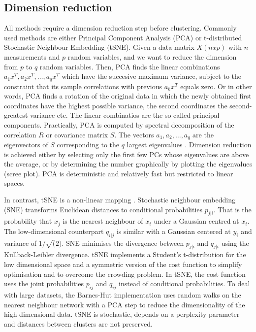 \documentclass[11pt, a4paper]{article}\usepackage[]{graphicx}\usepackage[]{color}
\begin{document}
\subsection{Dimension reduction}
All methods require a dimension reduction step before clustering. Commonly used methods are either Principal Component Analysis (PCA) \citep{hotelling1933analysis} or t-distributed Stochastic Neighbour Embedding (tSNE). Given a data matrix $X (nxp)$ with $n$ measurements and $p$ random variables, and we want to reduce the dimension from $p$ to $q$ random variables. Then, PCA finds the linear combinations $a_{1}x^T, a_{2}x^T,\ldots, a_{q}x^T$ which have the succesive maximum variance, subject to the constraint that its sample correlations with previous $a_{k}x^T$ equals zero.
Or in other words, PCA finds a rotation of the original data in which the newly obtained first coordinates have the highest possible variance, the second coordinates the second-greatest variance etc. The linear combinatios are the so called principal components.
Practically, PCA is computed by spectral decomposition of the correlation $R$ or covariance matrix $S$. The vectors $a_{1}, a_{2},\ldots, a_{q}$ are the eigenvectors of $S$ corresponding to the $q$ largest eigenvalues \citep{jolliffe1986principal}.  Dimension reduction is achieved either by selecting only the first few PCs whose eigenvalues are above the average, or by determining the number graphically by plotting the eigenvalues (scree plot). PCA is deterministic and relatively fast but restricted to linear spaces.

In contrast,  tSNE is a non-linear mapping \citep{van2013barnes}. Stochastic neighbour embedding (SNE) transforms Euclidean distances to conditional probabilities $p_{j|i}$. That is the probability that \(x_j\) is the nearest neighbour of $x_i$ under a Gaussian centred at $x_i$. The low-dimensional counterpart $q_{i|j}$ is similar with a Gaussian centered at $y_i$ and variance of $1/\sqrt(2)$. SNE minimises the divergence between $p_{j|i}$ and $q_{j|i}$ using the Kullback-Leibler divergence. tSNE implements a Student's t-distribution for the low dimensional space and a symmetric version of the cost function to simplify optimisation and to overcome the crowding problem. In tSNE, the cost function uses the joint probabilities $p_{ij}$ and $q_{ij}$ instead of conditional probabilities. To deal with large datasets, the Barnes-Hut implementation uses random walks on the nearest neighbour network with a PCA step to reduce the dimensionality of the high-dimensional data. tSNE is stochastic, depends on a perplexity parameter and distances between clusters are not preserved. 
\end{document}
